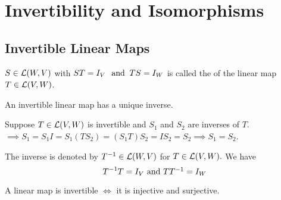 \section{Invertibility and Isomorphisms}

\subsection{Invertible Linear Maps}
  \setcounter{thm}{58}
  \begin{mydef} 
    $S\in \mathcal{L}(W,V)$ with $ST=I_V \;\;\, \text{and}\;\; TS = I_W$ is called the  of the  linear map $T \in \mathcal{L}(V,W)$.
  \end{mydef}

  \begin{thm} 
    An invertible  linear map has a unique inverse.
  \end{thm}
  \begin{prf}
    Suppose $T\in {\mathcal{L}(V,W)}$ is invertible and $S_1$ and $S_2$ are inverses of $T$. $\implies S_1 = S_1 I = S_1 (T S_2) = (S_1 T) S_2 = I S_2 = S_2 \implies S_1 = S_2$.
  \end{prf}

  \begin{mydef} [notation $T^{-1}$]
    The inverse is denoted by $T^{-1}\in \mathcal{L}(W,V)$ for $T\in \mathcal{L}(V,W).$ We have
    \begin{equation}
      T^{-1}T=I_V$ and $T T^{-1} = I_W
    \end{equation}
  \end{mydef}

  \begin{thm} 
    A linear map is invertible $\iff$ it is injective and surjective.
  \end{thm}

